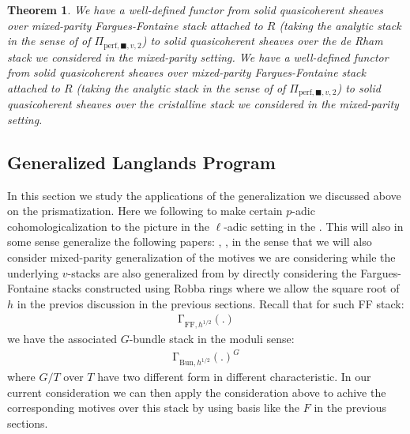 \documentclass[12pt]{article}
\newtheorem{theorem}{Theorem}
\theoremstyle{definition}
\begin{document}
\begin{theorem}
We have a well-defined functor from solid quasicoherent sheaves over mixed-parity Fargues-Fontaine stack attached to $R$ (taking the analytic stack in the sense of \cite{CS3} of $\Pi_{\mathrm{perf},\blacksquare,v,2}$) to solid quasicoherent sheaves over the de Rham stack we considered in the mixed-parity setting. We have a well-defined functor from solid quasicoherent sheaves over mixed-parity Fargues-Fontaine stack attached to $R$ (taking the analytic stack in the sense of \cite{CS3} of $\Pi_{\mathrm{perf},\blacksquare,v,2}$) to solid quasicoherent sheaves over the cristalline stack we considered in the mixed-parity setting.  
\end{theorem}


\subsection{Generalized Langlands Program}

\noindent In this section we study the applications of the generalization we discussed above on the prismatization. Here we following \cite{FS} to make certain $p$-adic cohomologicalization to the picture in the $\ell$-adic setting in the \cite{FS}. This will also in some sense generalize the following papers: \cite{TIV}, \cite{TV}, \cite{TVI} in the sense that we will also consider mixed-parity generalization of the motives we are considering while the underlying $v$-stacks are also generalized from \cite{FS} by directly considering the Fargues-Fontaine stacks constructed using Robba rings where we allow the square root of $h$ in the previos discussion in the previous sections. Recall that for such FF stack:
\begin{align}
\mathrm{\Gamma}_{\mathrm{FF},h^{1/2}}(.)
\end{align}
we have the associated $G$-bundle stack in the moduli sense:
\begin{align}
\mathrm{\Gamma}_{\mathrm{Bun},h^{1/2}}(.)^G
\end{align}
where $G/T$ over $T$ have two different form in different characteristic. In our current consideration we can then apply the consideration above to achive the corresponding motives over this stack by using basis like the $F$ in the previous sections.
\end{document}
